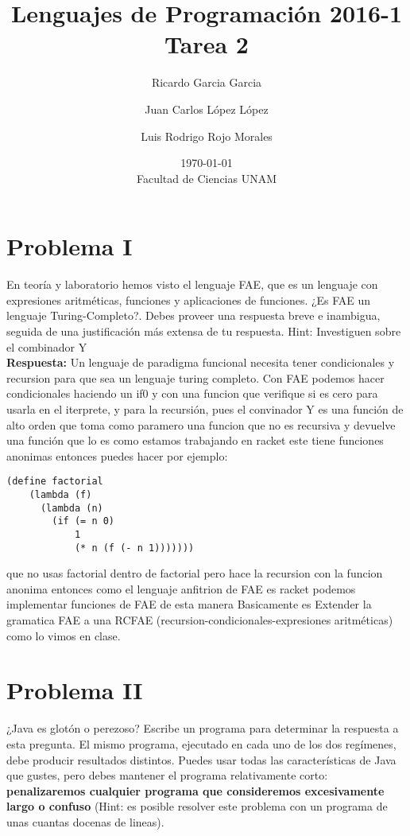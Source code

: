 \documentclass{article}
\title{Lenguajes de Programación 2016-1\\Tarea 2}
\author{Ricardo Garcia Garcia \and  Juan Carlos López López \and Luis Rodrigo Rojo Morales}
\date{\today\\ Facultad de Ciencias UNAM}
\begin{document}
\maketitle
\section*{Problema I}
En teoría y laboratorio hemos visto el lenguaje FAE, que es un lenguaje
con expresiones aritméticas, funciones y aplicaciones de funciones.
¿Es FAE un lenguaje Turing-Completo?. Debes proveer una respuesta breve e inambigua, seguida de una justificación más extensa de tu respuesta.
Hint: Investiguen sobre el combinador Y
\\

\textbf{Respuesta: }
Un lenguaje de paradigma funcional necesita tener condicionales y recursion para que sea un lenguaje turing completo.
Con FAE podemos hacer condicionales haciendo un if0 y con una funcion que verifique si es cero para usarla en el iterprete,
y para la recursión, pues el convinador Y es una función de alto orden que toma como paramero una funcion que no es 
recursiva y devuelve una función que lo es como estamos trabajando en racket este tiene funciones anonimas entonces puedes hacer por ejemplo: 

\begin{verbatim}
(define factorial
    (lambda (f)
      (lambda (n)
        (if (= n 0)
            1
            (* n (f (- n 1)))))))
\end{verbatim}        

que no usas factorial dentro de factorial pero hace la recursion con la funcion anonima entonces como el lenguaje anfitrion de FAE es racket podemos implementar funciones de FAE de esta manera
Basicamente es Extender la gramatica FAE a una RCFAE (recursion-condicionales-expresiones aritméticas) como lo vimos en clase.

\section*{Problema II}
¿Java es glotón o perezoso? Escribe un programa para determinar la respuesta a esta
pregunta. El mismo programa, ejecutado en cada uno de los dos regímenes, debe
producir resultados distintos. Puedes usar todas las características de Java
que gustes, pero debes mantener el programa relativamente corto:
\textbf{penalizaremos cualquier programa que consideremos excesivamente
  largo o confuso } (Hint: es posible resolver este problema con un programa
de unas cuantas docenas de lineas).
\\
\end{document}
